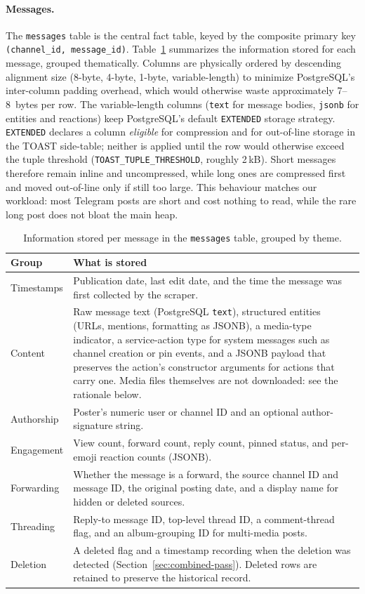 \paragraph{Messages.}
The \texttt{messages} table is the central fact table, keyed by the composite primary key \texttt{(channel\_id, message\_id)}.
Table~\ref{tab:messages} summarizes the information stored for each message, grouped thematically.
Columns are physically ordered by descending alignment size (8-byte, 4-byte, 1-byte, variable-length) to minimize PostgreSQL's inter-column padding overhead, which would otherwise waste approximately 7--8~bytes per row.
The variable-length columns (\texttt{text} for message bodies, \texttt{jsonb} for entities and reactions) keep PostgreSQL's default \texttt{EXTENDED} storage strategy. \texttt{EXTENDED} declares a column \emph{eligible} for compression and for out-of-line storage in the TOAST side-table; neither is applied until the row would otherwise exceed the tuple threshold (\texttt{TOAST\_TUPLE\_THRESHOLD}, roughly 2\,kB). Short messages therefore remain inline and uncompressed, while long ones are compressed first and moved out-of-line only if still too large. This behaviour matches our workload: most Telegram posts are short and cost nothing to read, while the rare long post does not bloat the main heap.

\begin{table}[htbp]
\centering
\caption{Information stored per message in the \texttt{messages} table, grouped by theme.}
\label{tab:messages}
\small
\begin{tabular}{@{}lp{8.5cm}@{}}
\toprule
\textbf{Group} & \textbf{What is stored} \\
\midrule
Timestamps      & Publication date, last edit date, and the time the message was first collected by the scraper. \\
Content         & Raw message text (PostgreSQL \texttt{text}), structured entities (URLs, mentions, formatting as JSONB), a media-type indicator, a service-action type for system messages such as channel creation or pin events, and a JSONB payload that preserves the action's constructor arguments for actions that carry one. Media files themselves are not downloaded: see the rationale below. \\
Authorship      & Poster's numeric user or channel ID and an optional author-signature string. \\
Engagement      & View count, forward count, reply count, pinned status, and per-emoji reaction counts (JSONB). \\
Forwarding      & Whether the message is a forward, the source channel ID and message ID, the original posting date, and a display name for hidden or deleted sources. \\
Threading       & Reply-to message ID, top-level thread ID, a comment-thread flag, and an album-grouping ID for multi-media posts. \\
Deletion        & A deleted flag and a timestamp recording when the deletion was detected (Section~\ref{sec:combined-pass}). Deleted rows are retained to preserve the historical record. \\
\bottomrule
\end{tabular}
\end{table}

